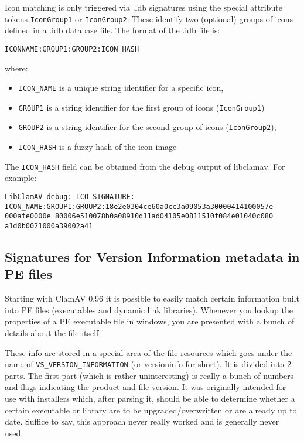\documentclass[a4paper,titlepage,12pt]{article}
\begin{document}
    Icon matching is only triggered via .ldb signatures using the special
    attribute tokens \verb+IconGroup1+ or \verb+IconGroup2+. These identify
    two (optional) groups of icons defined in a .idb database file. The
    format of the .idb file is:
    \begin{verbatim}
ICONNAME:GROUP1:GROUP2:ICON_HASH
    \end{verbatim}
    where:
    \begin{itemize}
	\item \verb+ICON_NAME+ is a unique string identifier for a specific
	icon,
	\item \verb+GROUP1+ is a string identifier for the first group of
	icons (\verb+IconGroup1+)
	\item \verb+GROUP2+ is a string identifier for the second group of
	icons (\verb+IconGroup2+),
	\item \verb+ICON_HASH+ is a fuzzy hash of the icon image
    \end{itemize}
    The \verb+ICON_HASH+ field can be obtained from the debug output of
    libclamav. For example:
    \begin{verbatim}
LibClamAV debug: ICO SIGNATURE:
ICON_NAME:GROUP1:GROUP2:18e2e0304ce60a0cc3a09053a30000414100057e
000afe0000e 80006e510078b0a08910d11ad04105e0811510f084e01040c080
a1d0b0021000a39002a41
    \end{verbatim}

    \subsection{Signatures for Version Information metadata in PE files}
    Starting with ClamAV 0.96 it is possible to easily match certain
    information built into PE files (executables and dynamic link libraries).
    Whenever you lookup the properties of a PE executable file in windows,
    you are presented with a bunch of details about the file itself.

    These info are stored in a special area of the file resources which goes
    under the name of \verb+VS_VERSION_INFORMATION+ (or versioninfo for short).
    It is divided into 2 parts. The first part (which is rather uninteresting)
    is really a bunch of numbers and flags indicating the product and file
    version. It was originally intended for use with installers which, after
    parsing it, should be able to determine whether a certain executable or
    library are to be upgraded/overwritten or are already up to date. Suffice
    to say, this approach never really worked and is generally never used.
\end{document}
